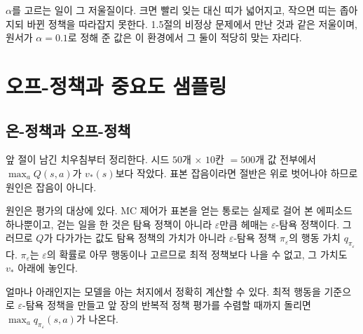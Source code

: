 \documentclass[11pt,a4paper]{article}
\begin{document}
$\alpha$를 고르는 일이 그 저울질이다. 크면 빨리 잊는 대신 띠가 넓어지고, 작으면 띠는 좁아지되
바뀐 정책을 따라잡지 못한다. 1.5절의 비정상 문제에서 만난 것과 같은 저울이며, 원서가
$\alpha=0.1$로 정해 준 값은 이 환경에서 그 둘이 적당히 맞는 자리다.

\section{오프-정책과 중요도 샘플링}
\label{sec:offpolicy}

\subsection{온-정책과 오프-정책}
\label{sec:on-off}

앞 절이 남긴 치우침부터 정리한다. 시드 $50$개 $\times$ $10$칸 $=500$개 값 전부에서
$\max_a Q(s,a)$가 $v_*(s)$보다 작았다. 표본 잡음이라면 절반은 위로 벗어나야 하므로 원인은 잡음이
아니다.

원인은 평가의 대상에 있다. MC 제어가 표본을 얻는 통로는 실제로 걸어 본 에피소드 하나뿐이고, 걷는
일을 한 것은 탐욕 정책이 아니라 $\varepsilon$만큼 헤매는 $\varepsilon$-탐욕 정책이다. 그러므로
$Q$가 다가가는 값도 탐욕 정책의 가치가 아니라 $\varepsilon$-탐욕 정책 $\pi_\varepsilon$의 행동 가치
$q_{\pi_\varepsilon}$다. $\pi_\varepsilon$는 $\varepsilon$의 확률로 아무 행동이나 고르므로 최적
정책보다 나을 수 없고, 그 가치도 $v_*$ 아래에 놓인다.

얼마나 아래인지는 모델을 아는 처지에서 정확히 계산할 수 있다. 최적 행동을 기준으로
$\varepsilon$-탐욕 정책을 만들고 앞 장의 반복적 정책 평가를 수렴할 때까지 돌리면
$\max_a q_{\pi_\varepsilon}(s,a)$가 나온다.
\end{document}
